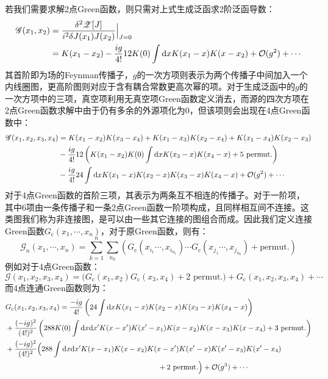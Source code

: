 若我们需要求解2点Green函数，则只需对上式生成泛函求2阶泛函导数：
\begin{align}
\mathscr{G}(x_1,x_2)&=\frac{\delta^2 \mathscr{Z}[J]}{i^2\delta J(x_1) J(x_2)}\Big|_{J=0}\notag\\
&=K(x_1-x_2)-\frac{ig}{4!}12K(0)\int\mathrm{d}x K(x_1-x)K(x-x_2)+\mathcal{O}(g^2)+\cdots
\label{eq:G2}
\end{align}
其首阶即为场的Feynman传播子，$g$的一次方项则表示为两个传播子中间加入一个内线圈图，更高阶图则对应于含有耦合常数更高次幂的项。对于生成泛函中的$g$的一次方项中的三项，真空项利用无真空项Green函数定义消去，而源的四次方项在2点Green函数求解中由于仍有多余的外源项化为0，但该项则会出现在4点Green函数中：
	\begin{align}
	\mathscr{G}(x_1,x_2,x_3,x_4)&=K(x_1-x_2)K(x_3-x_4)+K(x_1-x_3)K(x_2-x_4)+K(x_1-x_4)K(x_2-x_3)\notag\\
	&-\frac{ig}{4!}12\left(K(x_1-x_2)K(0)\int\mathrm{d}xK(x_3-x)K(x_4-x)+\text{5 permut.}\right)\notag\\
	&-\frac{ig}{4!}24\int\mathrm{d}x K(x_1-x)K(x_2-x)K(x_3-x)K(x_4-x)+\mathcal{O}(g^2)+\cdots
	\end{align}
对于4点Green函数的首阶三项，其表示为两条互不相连的传播子。对于一阶项，其中6项由一条传播子和一条2点Green函数一阶项构成，且同样相互间不连接。这类图我们称为非连接图，是可以由一些其它连接的图组合而成。因此我们定义连接Green函数$G_{\text{c}}(x_1,\cdots,x_n)$，对于原Green函数，则有：
\begin{equation}
\mathscr{G}_n(x_1,\cdots,x_n)=\sum_{k=1}^{n}\sum_{n_k}(G_{\text{c}}(x_{i_1}\cdots, x_{i_{n_1}})\cdots G_{\text{c}}(x_{j_1}\cdots,x_{j_{n_k}})+\text{permut.})
\end{equation}
例如对于4点Green函数：
\begin{equation}
\mathscr{G}(x_1,x_2,x_3,x_4)=\Big(G_{\text{c}}(x_1,x_2)G_{\text{c}}(x_3,x_4)+\text{2 permut.}\Big)+G_{\text{c}}(x_1,x_2,x_3,x_4)+\cdots
\end{equation}
而4点连通Green函数则为：
\begin{align}
	&G_{\text{c}}(x_1,x_2,x_3,x_4)=\frac{-ig}{4!}\left(24\int\mathrm{d}x K(x_1-x)K(x_2-x)K(x_3-x)K(x_4-x)\right)\notag\\
	&+\frac{(-ig)^2}{(4!)^2}\left(288K(0)\int\mathrm{d}x\mathrm{d}x'K(x-x')K(x'-x_1)K(x-x_2)K(x-x_3)K(x-x_4)+\text{3 permut.}\right)\notag\\
	&+\frac{(-ig)^2}{(4!)^2}\Big(288\int\mathrm{d}x\mathrm{d}x'K(x-x_1)K(x-x_2)K(x-x')K(x'-x)K(x'-x_3)K(x'-x_4)\notag\\
	&\hspace{7.3cm}+\text{2 permut.}\Big)+\mathcal{O}(g^3)+\cdots
	\label{eq:G4}
	\end{align}

